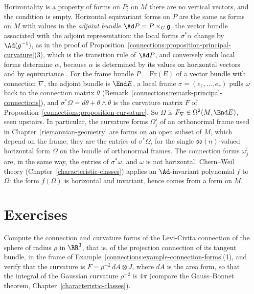 \begin{remark}\label{connections:remark-curvature-horizontal}
Horizontality is a property of forms on $P$; on $M$ there are no vertical vectors, and the condition is empty. Horizontal equivariant forms on $P$ are the same as forms on $M$ with values in the
\emph{adjoint bundle} $\Ad P = P \times_G \mathfrak{g}$, the vector bundle associated with the adjoint representation: the local forms $\sigma^*\alpha$ change by $\Ad(g^{-1})$, as in the proof of
Proposition~\ref{connections:proposition-principal-curvature}(3), which is the transition rule of $\Ad P$, and conversely such local forms determine $\alpha$, because $\alpha$ is determined by its values on
horizontal vectors and by equivariance \cite[Chapter II, \S5]{kobayashi-nomizu}. For the frame bundle $P = \mathrm{Fr}(E)$ of a vector bundle with connection $\nabla$, the adjoint bundle is $\End E$, a local
frame $\sigma = (e_1, \ldots, e_r)$ pulls $\omega$ back to the connection matrix $\theta$ (Remark~\ref{connections:remark-principal-connections}), and $\sigma^*\Omega = d\theta + \theta \wedge \theta$ is the
curvature matrix $F$ of Proposition~\ref{connections:proposition-curvature}. So $\Omega$ is $F_\nabla \in \Omega^2(M, \End E)$, seen upstairs. In particular, the curvature forms $\Omega^i_j$ of an orthonormal
frame used in Chapter~\ref{riemannian-geometry} are forms on an open subset of $M$, which depend on the frame; they are the entries of $\sigma^*\Omega$, for the single $\mathfrak{so}(n)$-valued horizontal form
$\Omega$ on the bundle of orthonormal frames. The connection forms $\omega^i_j$ are, in the same way, the entries of $\sigma^*\omega$, and $\omega$ is not horizontal. Chern--Weil theory
(Chapter~\ref{characteristic-classes}) applies an $\Ad$-invariant polynomial $f$ to $\Omega$: the form $f(\Omega)$ is horizontal and invariant, hence comes from a form on $M$.
\end{remark}

\section{Exercises}\label{connections:section-exercises}

\begin{exercise}\label{connections:exercise-curvature-sphere}
Compute the connection and curvature forms of the Levi-Civita connection of the sphere of radius $\rho$ in $\RR^3$, that is, of the projection connection of its tangent
bundle, in the frame of Example~\ref{connections:example-connection-forms}(1), and verify that the curvature is $F = \rho^{-2}\,dA \otimes J$, where $dA$ is the area form, so that
the integral of the Gaussian curvature $\rho^{-2}$ is $4\pi$ (compare the Gauss--Bonnet theorem, Chapter~\ref{characteristic-classes}).
\end{exercise}

